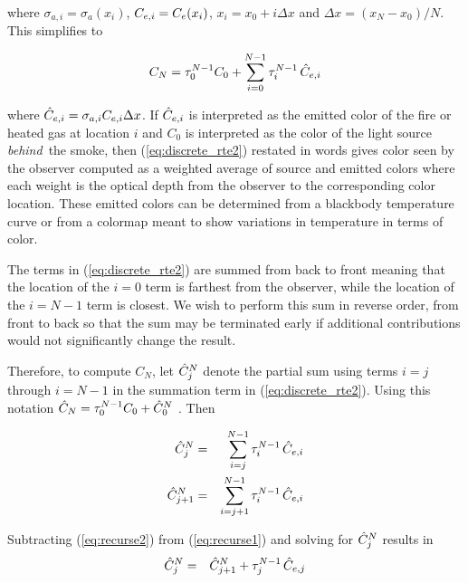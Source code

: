 \noindent where $\sigma_{a,i}=\sigma_a(x_i)$, $C_{e,i}=C_e(x_i)$,
$x_i=x_0+i\Delta x$ and $\Delta x=(x_N-x_0)/N$. This simplifies to

\begin{equation}
\label{eq:discrete_rte2}
C_N = \tau_{0}^{N-1}C_0 + \sum_{i=0}^{N-1}\tau_{i}^{N-1}\,\hat{C}_{e,i}
\end{equation}

\noindent where $\hat{C}_{e,i}=\sigma_{a,i}C_{e,i}\Delta x$.  If
$\hat{C}_{e,i}$ is interpreted as the emitted color of the fire or
heated gas at location $i$ and $C_0$ is interpreted as the color
of the light source {\em behind}\ the smoke, then
(\ref{eq:discrete_rte2}) restated in words gives color seen by the
observer computed as a weighted average of source and emitted
colors where each weight is the optical depth from the observer to
the corresponding color location.  These emitted colors can be
determined from a blackbody temperature curve or from a colormap
meant to show variations in temperature in terms of color.


The terms in (\ref{eq:discrete_rte2}) are summed from back to
front meaning that the location of the $i=0$ term is farthest from
the observer, while the location of the $i=N-1$ term is closest.
We wish to perform this sum in reverse order, from front to back
so that the sum may be terminated early if additional
contributions would not significantly change the result.

Therefore, to compute $C_N$, let $\hat{C}_{j}^N$ denote the partial
sum using terms $i=j$ through $i=N-1$ in the summation term in
(\ref{eq:discrete_rte2}).  Using this notation
$\hat{C}_N=\tau_{0}^{N-1}C_0+\hat{C}_{0}^N$ . Then

\begin{eqnarray}
\label{eq:recurse1}
\hat{C}_{j}^N &= &\sum_{i=j}^{N-1}\tau_{i}^{N-1}\,\hat{C}_{e,i}\\
\label{eq:recurse2}
\hat{C}_{j+1}^N     &= &\sum_{i=j+1}^{N-1}  \tau_{i}^{N-1}\,\hat{C}_{e,i}
\end{eqnarray}

Subtracting (\ref{eq:recurse2}) from (\ref{eq:recurse1}) and solving
for $\hat{C}_{j}^N$ results in
\begin{eqnarray}
\label{eq:color}
\hat{C}_{j}^N&=&\hat{C}_{j+1}^N+\tau_{j}^{N-1}\,\hat{C}_{e,j}
\end{eqnarray}


